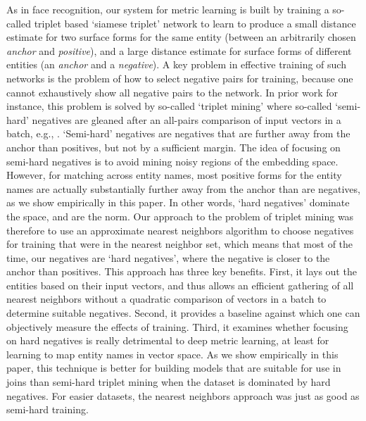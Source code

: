 As in face recognition, our system for metric learning is built by training a so-called triplet based `siamese triplet' network to learn to produce a small distance estimate for two surface forms for the same entity (between an arbitrarily chosen \textit{anchor} and \textit{positive}), and a large distance estimate for surface forms of different entities (an \textit{anchor} and a \textit{negative}).  A key problem in effective training of such networks is the problem of how to select negative pairs for training, because one cannot exhaustively show all negative pairs to the network.  In prior work for instance, this problem is solved by so-called `triplet mining' where so-called `semi-hard' negatives are gleaned after an all-pairs comparison of input vectors in a batch, e.g., \cite{DBLP:conf/cvpr/SchroffKP15}.  `Semi-hard' negatives are negatives that are further away from the anchor than positives, but not by a sufficient margin.  The idea of focusing on semi-hard negatives is to avoid mining noisy regions of the embedding space.  However, for matching across entity names, most positive forms for the entity names are actually substantially further away from the anchor than are negatives, as we show empirically in this paper.  In other words, `hard negatives' dominate the space, and are the norm.  Our approach to the problem of triplet mining was therefore to use an approximate nearest neighbors algorithm to choose negatives for training that were in the nearest neighbor set, which means that most of the time, our negatives are `hard negatives', where the negative is closer to the anchor than positives.  This approach has three key benefits.  First, it lays out the entities based on their input vectors, and thus allows an efficient gathering of all nearest neighbors without a quadratic comparison of vectors in a batch to determine suitable negatives.  Second, it provides a baseline against which one can objectively measure the effects of training.  Third, it examines whether focusing on hard negatives is really detrimental to deep metric learning, at least for learning to map entity names in vector space.  As we show empirically in this paper, this technique is better for building models that are suitable for use in joins than semi-hard triplet mining when the dataset is dominated by hard negatives.  For easier datasets, the nearest neighbors approach was just as good as semi-hard training.

